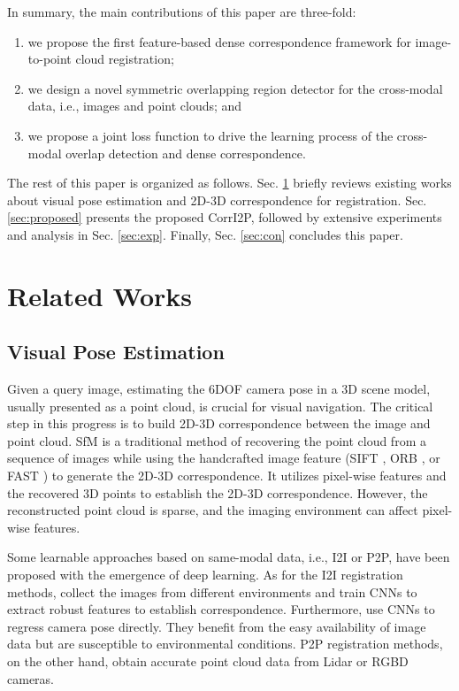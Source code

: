\documentclass[lettersize,journal]{IEEEtran}
\begin{document}
In summary, the main contributions of this paper are three-fold:
\begin{enumerate}
\item we propose the {first} feature-based {dense} correspondence framework for image-to-point cloud registration;
\item we design a novel {symmetric overlapping region detector} for the cross-modal data, i.e., images and point clouds; and
\item we propose a joint loss function to drive the learning process of the cross-modal overlap detection and dense correspondence.
\end{enumerate}

The rest of this paper is organized as follows. Sec. \ref{sec:RW} briefly reviews existing works about visual pose estimation and 2D-3D correspondence for registration. Sec. \ref{sec:proposed} presents the proposed CorrI2P, followed by extensive experiments and analysis in Sec. \ref{sec:exp}. Finally, Sec. \ref{sec:con} concludes this paper.  


\section{Related Works}
\label{sec:RW}
\subsection{Visual Pose Estimation}
Given a query image, estimating the 6DOF camera pose in a 3D scene model, usually presented as a point cloud, is crucial for visual navigation. The critical step in this progress is to build 2D-3D correspondence between the image and point cloud. SfM \cite{SFM} is a traditional method of recovering the point cloud from a sequence of images while using the handcrafted image feature (SIFT \cite{SIFT}, ORB \cite{ORB}, or FAST \cite{FAST}) to generate the 2D-3D correspondence. It utilizes pixel-wise features and the recovered 3D points to establish the 2D-3D correspondence. However, the reconstructed point cloud is sparse, and the imaging environment can affect pixel-wise features.

Some learnable approaches based on same-modal data, i.e., I2I or P2P, have been proposed with the emergence of deep learning. As for the I2I registration methods, \cite{overtime1,overtime2} collect the images from different environments and train CNNs to extract robust features to establish correspondence. Furthermore, \cite{REGPOSE1,REGPOSE2,REGPOSE3} use CNNs to regress camera pose directly. They benefit from the easy availability of image data but are susceptible to environmental conditions. P2P registration methods, on the other hand, obtain accurate point cloud data from Lidar or RGBD cameras.
\end{document}
